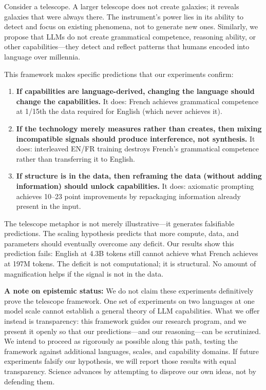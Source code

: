 \documentclass[11pt,a4paper]{article}
\begin{document}
Consider a telescope. A larger telescope does not create galaxies; it reveals galaxies that were always there. The instrument's power lies in its ability to detect and focus on existing phenomena, not to generate new ones. Similarly, we propose that LLMs do not create grammatical competence, reasoning ability, or other capabilities---they detect and reflect patterns that humans encoded into language over millennia.

This framework makes specific predictions that our experiments confirm:

\begin{enumerate}
    \item \textbf{If capabilities are language-derived, changing the language should change the capabilities.} It does: French achieves grammatical competence at 1/15th the data required for English (which never achieves it).

    \item \textbf{If the technology merely measures rather than creates, then mixing incompatible signals should produce interference, not synthesis.} It does: interleaved EN/FR training destroys French's grammatical competence rather than transferring it to English.

    \item \textbf{If structure is in the data, then reframing the data (without adding information) should unlock capabilities.} It does: axiomatic prompting achieves 10--23 point improvements by repackaging information already present in the input.
\end{enumerate}

The telescope metaphor is not merely illustrative---it generates falsifiable predictions. The scaling hypothesis predicts that more compute, data, and parameters should eventually overcome any deficit. Our results show this prediction fails: English at 4.3B tokens still cannot achieve what French achieves at 197M tokens. The deficit is not computational; it is structural. No amount of magnification helps if the signal is not in the data.

\textbf{A note on epistemic status:} We do not claim these experiments definitively prove the telescope framework. One set of experiments on two languages at one model scale cannot establish a general theory of LLM capabilities. What we offer instead is transparency: this framework guides our research program, and we present it openly so that our predictions---and our reasoning---can be scrutinized. We intend to proceed as rigorously as possible along this path, testing the framework against additional languages, scales, and capability domains. If future experiments falsify our hypothesis, we will report those results with equal transparency. Science advances by attempting to disprove our own ideas, not by defending them.
\end{document}
